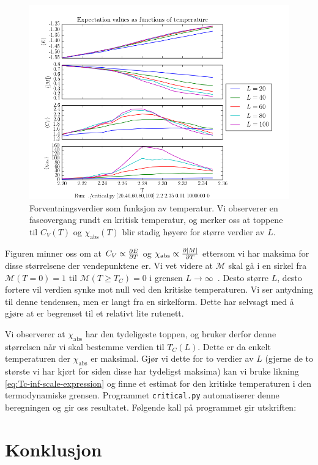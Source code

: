 \documentclass[11pt]{article}
\newcommand{\abs}[1]{|#1|}
\begin{document}
\begin{figure}[ht]
  \centering
  \includegraphics[scale=0.7]{../fig/critical.png}
  \caption{\label{fig:critical-plot} Forventningsverdier som funksjon
    av temperatur. Vi observerer en faseovergang rundt en kritisk
    temperatur, og merker oss at toppene til $C_V(T)$ og
    $\chi_\text{abs}(T)$ blir stadig høyere for større verdier av $L$.}
\end{figure}
Figuren minner oss om at $C_V \propto \frac{\partial E}{\partial T}$ og $\chi_\text{abs}
\propto \pd{\abs{M}}{T}$ ettersom vi har maksima for disse størrelsene
der vendepunktene er. Vi vet videre at $\mathcal{M}$ skal gå i
en sirkel fra $\mathcal{M}(T=0)=1$ til $\mathcal{M}(T\geq T_C)=0$ i
grensen $L\rightarrow\infty$~\cite{ising-model-texas-uni}. Desto
større $L$, desto fortere vil verdien synke mot null ved den kritiske
temperaturen. Vi ser antydning til denne tendensen, men er langt fra
en sirkelform. Dette har selvsagt med å gjøre at er begrenset til et
relativt lite rutenett. 

Vi observerer at $\chi_\text{abs}$ har den tydeligeste toppen, og
bruker derfor denne størrelsen når vi skal bestemme verdien til
$T_C(L)$. Dette er da enkelt temperaturen der $\chi_\text{abs}$ er
maksimal. Gjør vi dette for to verdier av $L$ (gjerne de to største vi
har kjørt for siden disse har tydeligst maksima) kan vi bruke likning
\eqref{eq:Tc-inf-scale-expression} og finne et estimat for den
kritiske temperaturen i den termodynamiske grensen. Programmet
\texttt{critical.py} automatiserer denne beregningen og gir oss
resultatet. Følgende kall på programmet gir utskriften:

\section{Konklusjon}


\clearpage
\printbibliography
\end{document}
